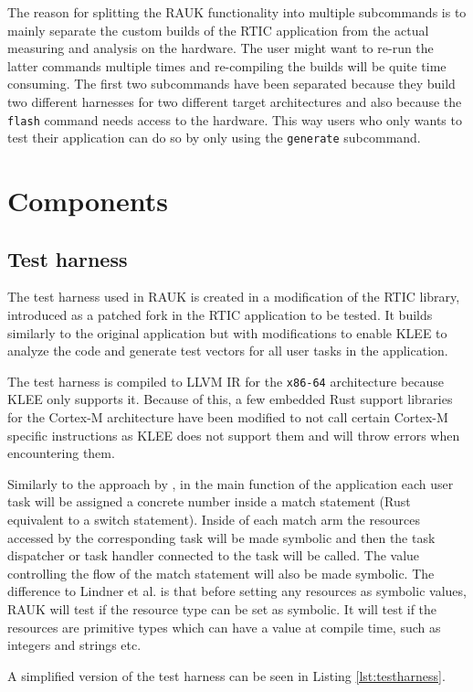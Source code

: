 The reason for splitting the RAUK functionality into multiple subcommands is to
mainly separate the custom builds of the RTIC application from the actual
measuring and analysis on the hardware. The user might want to re-run the latter
commands multiple times and re-compiling the builds will be quite time
consuming. The first two subcommands have been separated because they build
two different harnesses for two different target architectures and also because
the \texttt{flash} command needs access to the hardware. This way users who only
wants to test their application can do so by only using the \texttt{generate}
subcommand.

\section{Components}

\subsection{Test harness}
The test harness used in RAUK is created in a modification of the RTIC library,
introduced as a patched fork in the RTIC application to be tested. It builds
similarly to the original application but with modifications to enable KLEE to
analyze the code and generate test vectors for all user tasks in the
application.

The test harness is compiled to LLVM IR for the \texttt{x86-64} architecture
because KLEE only supports it. Because of this, a few embedded Rust support
libraries for the Cortex-M architecture have been modified to not call certain
Cortex-M specific instructions as KLEE does not support them and will throw
errors when encountering them.

Similarly to the approach by \cite{lindner}, in the main function of the
application each user task will be assigned a concrete number inside a match
statement (Rust equivalent to a switch statement). Inside of each match arm the
resources accessed by the corresponding task will be made symbolic and then
the task dispatcher or task handler connected to the task will be called. The
value controlling the flow of the match statement will also be made symbolic.
The difference to Lindner et al. is that before setting any resources as
symbolic values, RAUK will test if the resource type can be set as symbolic. It
will test if the resources are primitive types which can have a value at
compile time, such as integers and strings etc.

A simplified version of the test harness can be seen in Listing
\ref{lst:testharness}.

